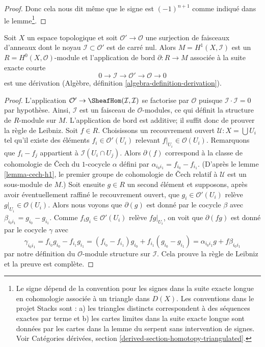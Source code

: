 {\begin{proof}
Donc cela nous dit même que le signe est $(-1)^{n + 1}$ comme indiqué dans le lemme\footnote{Le signe dépend de la convention pour les signes dans la suite exacte longue en cohomologie associée à un triangle dans $D(X)$. Les conventions dans le projet Stacks sont : a) les triangles distincts correspondent à des séquences exactes par terme et b) les cartes limites dans la suite exacte longue sont données par les cartes dans la lemme du serpent sans intervention de signes. Voir Catégories dérivées, section \ref{derived-section-homotopy-triangulated}.}.

\end{proof}

\begin{lemma}

\label{lemma-boundary-derivation-over-cup-product}

Soit $X$ un espace topologique et soit $\mathcal{O}' \to \mathcal{O}$ une surjection de faisceaux d'anneaux dont le noyau $\mathcal{I} \subset \mathcal{O}'$
est de carré nul. Alors $M = H^1(X, \mathcal{I})$ est un
$R = H^0(X, \mathcal{O})$-module et l'application de bord
$\partial : R \to M$ associée à la suite exacte courte
$$
0 \to \mathcal{I} \to \mathcal{O}' \to \mathcal{O} \to 0
$$
est une dérivation (Algèbre, définition \ref{algebra-definition-derivation}).

\end{lemma}

\begin{proof}

L'application $\mathcal{O}' \to \SheafHom(\mathcal{I}, \mathcal{I})$
se factorise par $\mathcal{O}$ puisque $\mathcal{I} \cdot \mathcal{I} = 0$
par hypothèse. Ainsi, $\mathcal{I}$ est un faisceau de $\mathcal{O}$-modules, ce qui définit la structure de $R$-module sur $M$. L'application de bord est additive; il suffit donc de prouver la règle de Leibniz. Soit $f \in R$. Choisissons un recouvrement ouvert
$\mathcal{U} : X = \bigcup U_i$ tel qu'il existe des éléments
$f_i \in \mathcal{O}'(U_i)$ relevant $f|_{U_i} \in \mathcal{O}(U_i)$. Remarquons que $f_i - f_j$ appartient à $\mathcal{I}(U_i \cap U_j)$. Alors $\partial(f)$ correspond à la classe de cohomologie de {\v C}ech du $1$-cocycle $\alpha$ défini par $\alpha_{i_0i_1} = f_{i_0} - f_{i_1}$. (D'après le lemme \ref{lemma-cech-h1}, le premier groupe de cohomologie de {\v C}ech relatif à $\mathcal{U}$ est un sous-module de $M$.) Soit ensuite $g \in R$ un second élément et supposons, après avoir éventuellement raffiné le recouvrement ouvert, que $g_i \in \mathcal{O}'(U_i)$ relève
$g|_{U_i} \in \mathcal{O}(U_i)$. Alors nous voyons que
$\partial(g)$ est donné par le cocycle $\beta$ avec
$\beta_{i_0i_1} = g_{i_0} - g_{i_1}$. Comme $f_ig_i \in \mathcal{O}'(U_i)$
relève $fg|_{U_i}$, on voit que
$\partial(fg)$ est donné par le cocycle $\gamma$ avec
$$
\gamma_{i_0i_1} = f_{i_0}g_{i_0} - f_{i_1}g_{i_1} =
(f_{i_0} - f_{i_1})g_{i_0} + f_{i_1}(g_{i_0} - g_{i_1}) =
\alpha_{i_0i_1}g + f\beta_{i_0i_1}
$$
par notre définition du $\mathcal{O}$-module structure sur $\mathcal{I}$. Cela prouve la règle de Leibniz et la preuve est complète.


\end{proof}}
